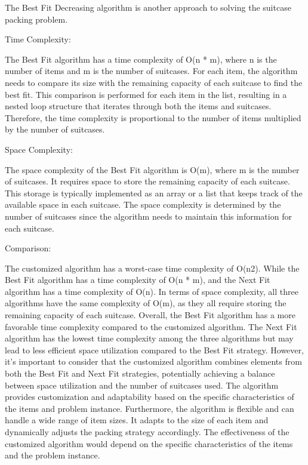 \documentclass[12pt]{article}
\begin{document}
The Best Fit Decreasing algorithm is another approach to solving the suitcase packing problem.

\vspace{0.5cm}
\noindent Time Complexity:

\noindent The Best Fit algorithm has a time complexity of O(n * m), where n is the number of items and m is the number of suitcases. For each item, the algorithm needs to compare its size with the remaining capacity of each suitcase to find the best fit. This comparison is performed for each item in the list, resulting in a nested loop structure that iterates through both the items and suitcases. Therefore, the time complexity is proportional to the number of items multiplied by the number of suitcases.

\vspace{0.5cm}
\noindent Space Complexity:

\noindent The space complexity of the Best Fit algorithm is O(m), where m is the number of suitcases. It requires space to store the remaining capacity of each suitcase. This storage is typically implemented as an array or a list that keeps track of the available space in each suitcase. The space complexity is determined by the number of suitcases since the algorithm needs to maintain this information for each suitcase.


\vspace{0.5cm}
\noindent Comparison:

\vspace{1cm}

The customized algorithm has a worst-case time complexity of O(n2). While the Best Fit algorithm has a time complexity of O(n * m), and the Next Fit algorithm has a time complexity of O(n). In terms of space complexity, all three algorithms have the same complexity of O(m), as they all require storing the remaining capacity of each suitcase. Overall, the Best Fit algorithm has a more favorable time complexity compared to the customized algorithm. The Next Fit algorithm has the lowest time complexity among the three algorithms but may lead to less efficient space utilization compared to the Best Fit strategy. However, it's important to consider that the customized algorithm combines elements from both the Best Fit and Next Fit strategies, potentially achieving a balance between space utilization and the number of suitcases used. The algorithm provides customization and adaptability based on the specific characteristics of the items and problem instance.  Furthermore, the algorithm is flexible and can handle a wide range of item sizes. It adapts to the size of each item and dynamically adjusts the packing strategy accordingly. The effectiveness of the customized algorithm would depend on the specific characteristics of the items and the problem instance.
\end{document}
